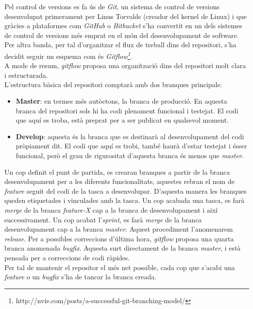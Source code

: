 Pel control de versions es fa ús de \textit{Git}, un sistema de control de versions desenvolupat primerament per Linus Torvalds (creador del kernel de Linux) i que gràcies a plataformes com \textit{GitHub} o \textit{Bitbucket} s'ha convertit en un dels sistemes de control de versions més emprat en el món del desenvolupament de software.\\
\newline Per altra banda, per tal d'organitzar el flux de treball dins del repositori, s'ha decidit seguir un esquema com és \textit{Gitflow\footnote{http://nvie.com/posts/a-successful-git-branching-model/}}.\\
A mode de resum, \textit{gitflow} proposa una organització dins del repositori molt clara i estructurada. \\
\newline L'estructura bàsica del repositori comptarà amb dos branques principals:
\begin{itemize}
	\item \textbf{Master}: en termes més autòctons, la branca de producció. En aquesta branca del repositori sols hi ha codi plenament funcional i testejat. El codi que aquí es troba, està preprat per a ser publicat en qualsevol moment.
	\item \textbf{Develop}: aquesta és la branca que es destinarà al desenvolupament del codi pròpiament dit. El codi que aquí es trobi, també haurà d'estar testejat i ésser funcional, però el grau de rigurositat d'aquesta branca és menos que \textit{master}.
\end{itemize}
Un cop definit el punt de partida, es crearan branques a partir de la branca desenvolupament per a les diferents funcionalitats, aquestes rebran el nom de \textit{feature} seguit del codi de la tasca a desenvolupar. D'aquesta manera les branques queden etiquetades i vinculades amb la tasca.
\newline Un cop acabada una tasca, es farà \textit{merge} de la branca \textit{feature-X} cap a la branca de desenvolupament i així successivament.
\newline Un cop acabat l'\textit{sprint}, es farà \textit{merge} de la branca desenvolupament cap a la branca \textit{master}. Aquest procediment l'anomenarem \textit{release}.
\newline Per a possibles correccions d'última hora, \textit{gitflow} proposa una quarta branca anomenada \textit{bugfix}. Aquesta surt directament de la branca \textit{master}, i està pensada per a correccions de codi ràpides.\\
Per tal de mantenir el repositor el més net possible, cada cop que s'acabi una \textit{feature} o un \textit{bugfix} s'ha de tancar la branca creada.

